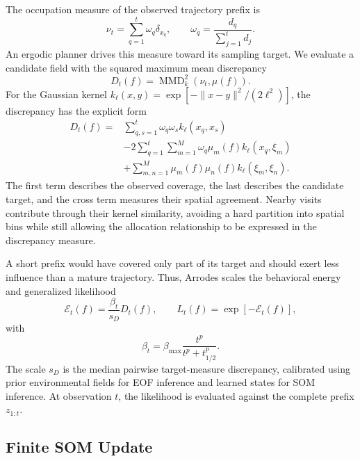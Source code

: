 \documentclass[letterpaper,10pt,conference]{ieeeconf}
\begin{document}
The occupation measure of the observed trajectory prefix is
\begin{equation}
  \nu_t=\sum_{q=1}^{t}\omega_q\delta_{x_q},\qquad
  \omega_q=\frac{d_q}{\sum_{j=1}^{t}d_j}.
  \label{eq:occupation}
\end{equation}
An ergodic planner drives this measure toward its sampling target. We evaluate a candidate field with the squared maximum mean discrepancy
\begin{equation}
  D_t(f)=\operatorname{MMD}_k^2\!\left(\nu_t,\mu(f)\right).
  \label{eq:mmd}
\end{equation}
For the Gaussian kernel $k_\ell(x,y)=\exp[-\|x-y\|^2/(2\ell^2)]$, the discrepancy has the explicit form \cite{gretton2012mmd}
\begin{equation}
\begin{split}
 D_t(f)={}&\sum_{q,s=1}^{t}\omega_q\omega_s k_\ell(x_q,x_s)\\
 &-2\sum_{q=1}^{t}\sum_{m=1}^{M}\omega_q\mu_m(f)k_\ell(x_q,\xi_m)\\
 &+\sum_{m,n=1}^{M}\mu_m(f)\mu_n(f)k_\ell(\xi_m,\xi_n).
\end{split}
\label{eq:mmd-expanded}
\end{equation}
The first term describes the observed coverage, the last describes the candidate target, and the cross term measures their spatial agreement. Nearby visits contribute through their kernel similarity, avoiding a hard partition into spatial bins while still allowing the allocation relationship to be expressed in the discrepancy measure.

A short prefix would have covered only part of its target and should exert less influence than a mature trajectory. Thus, Arrodes scales the behavioral energy and generalized likelihood
\begin{equation}
  \mathcal E_t(f)=\frac{\beta_t}{s_D}D_t(f),\qquad
  L_t(f)=\exp[-\mathcal E_t(f)],
  \label{eq:energy}
\end{equation}
with
\begin{equation}
  \beta_t=\beta_{\max}\frac{t^p}{t^p+t_{1/2}^{p}}.
  \label{eq:maturity}
\end{equation}
The scale $s_D$ is the median pairwise target-measure discrepancy, calibrated using prior environmental fields for EOF inference and learned states for SOM inference. At observation $t$, the likelihood is evaluated against the complete prefix $z_{1:t}$.

\subsection{Finite SOM Update}
\end{document}

